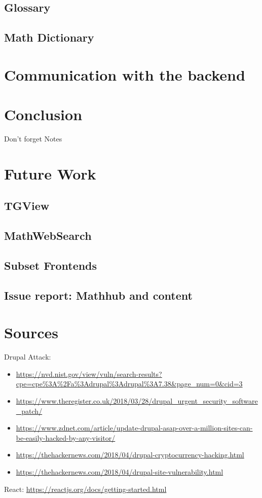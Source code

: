\documentclass[11pt,a4paper]{article}
\begin{document}
	\subsection{Glossary}
	\subsection{Math Dictionary}

\section{Communication with the backend}

\section{Conclusion}
Don't forget Notes

\section{Future Work}
	\subsection{TGView}
	\subsection{MathWebSearch}
	\subsection{Subset Frontends}
	\subsection{Issue report: Mathhub and content}

\section{Sources}
Drupal Attack:
\begin{itemize}
\item \url{https://nvd.nist.gov/view/vuln/search-results?cpe=cpe%3A%2Fa%3Adrupal%3Adrupal%3A7.38&page_num=0&cid=3}
\item \url{https://www.theregister.co.uk/2018/03/28/drupal_urgent_security_software_patch/}
\item \url{https://www.zdnet.com/article/update-drupal-asap-over-a-million-sites-can-be-easily-hacked-by-any-visitor/}
\item \url{https://thehackernews.com/2018/04/drupal-cryptocurrency-hacking.html}
\item \url{https://thehackernews.com/2018/04/drupal-site-vulnerability.html}
\end{itemize}

React: 
\url{https://reactjs.org/docs/getting-started.html}
\end{document}
